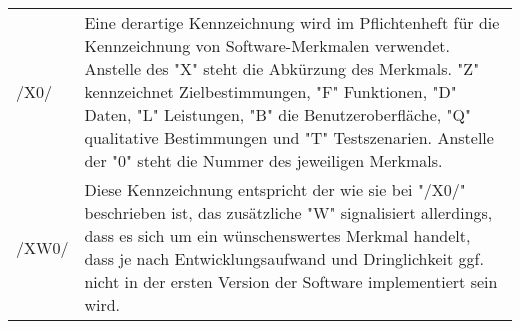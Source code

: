 \begin{tabular}{p{1.5cm}p{14.5cm}}

	/X0/	& Eine derartige Kennzeichnung wird im Pflichtenheft für die Kennzeichnung von Software-Merkmalen verwendet. Anstelle des "X" steht die Abkürzung des Merkmals. "Z" kennzeichnet Zielbestimmungen, "F" Funktionen, "D" Daten, "L" Leistungen, "B" die Benutzeroberfläche, "Q" qualitative Bestimmungen und "T" Testszenarien. Anstelle der "0" steht die Nummer des jeweiligen Merkmals.  \\
	/XW0/	& Diese Kennzeichnung entspricht der wie sie bei "/X0/" beschrieben ist, das zusätzliche "W" signalisiert allerdings, dass es sich um ein wünschenswertes Merkmal handelt, dass je nach Entwicklungsaufwand und Dringlichkeit ggf. nicht in der ersten Version der Software implementiert sein wird. \\

\end{tabular}